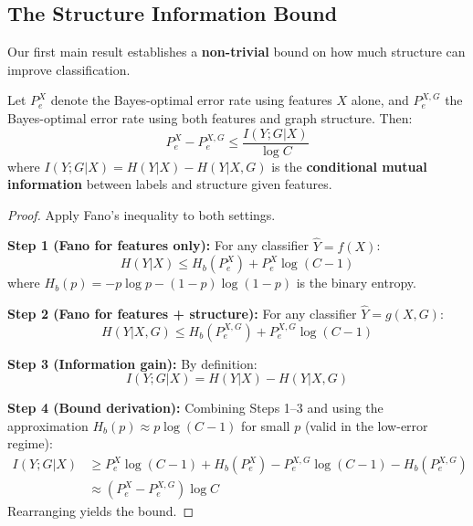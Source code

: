 \subsection{The Structure Information Bound}

Our first main result establishes a \textbf{non-trivial} bound on how much structure can improve classification.

\begin{theorem}
\label{thm:structure_bound}
Let $P_e^{X}$ denote the Bayes-optimal error rate using features $X$ alone, and $P_e^{X,G}$ the Bayes-optimal error rate using both features and graph structure. Then:
\begin{equation}
    P_e^{X} - P_e^{X,G} \leq \frac{I(Y; G | X)}{\log C}
\end{equation}
where $I(Y; G | X) = H(Y|X) - H(Y|X,G)$ is the \textbf{conditional mutual information} between labels and structure given features.
\end{theorem}

\begin{proof}
Apply Fano's inequality to both settings.

\textbf{Step 1 (Fano for features only):} For any classifier $\hat{Y} = f(X)$:
\begin{equation}
    H(Y|X) \leq H_b(P_e^{X}) + P_e^{X} \log(C-1)
\end{equation}
where $H_b(p) = -p\log p - (1-p)\log(1-p)$ is the binary entropy.

\textbf{Step 2 (Fano for features + structure):} For any classifier $\hat{Y} = g(X, G)$:
\begin{equation}
    H(Y|X,G) \leq H_b(P_e^{X,G}) + P_e^{X,G} \log(C-1)
\end{equation}

\textbf{Step 3 (Information gain):} By definition:
\begin{equation}
    I(Y; G | X) = H(Y|X) - H(Y|X,G)
\end{equation}

\textbf{Step 4 (Bound derivation):} Combining Steps 1--3 and using the approximation $H_b(p) \approx p\log(C-1)$ for small $p$ (valid in the low-error regime):
\begin{align}
    I(Y; G | X) &\geq P_e^{X}\log(C-1) + H_b(P_e^{X}) - P_e^{X,G}\log(C-1) - H_b(P_e^{X,G}) \\
    &\approx (P_e^{X} - P_e^{X,G}) \log C
\end{align}
Rearranging yields the bound.
\end{proof}


